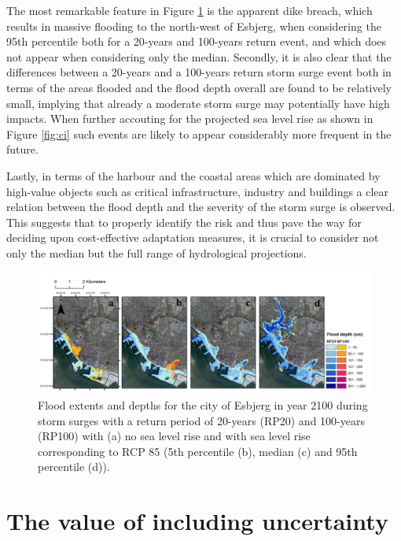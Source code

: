 \documentclass[note,screen,british,11pt]{nrdoc}
\begin{document}
The most remarkable feature in Figure \ref{fig:esbjerg} is the apparent dike breach, which results in massive flooding to the north-west of Esbjerg, when considering the 95th percentile both for a 20-years and 100-years return event, and which does not appear when considering only the median. Secondly, it is also clear that the differences between a 20-years and a 100-years return storm surge event both in terms of the areas flooded and the flood depth overall are found to be relatively small, implying that already a moderate storm surge may potentially have high impacts. When further accouting for the projected sea level rise as shown in Figure  \ref{fig:ci} such events are likely to appear considerably more frequent in the future.  

Lastly, in terms of the harbour and the coastal areas which are dominated by high-value objects such as critical infrastructure, industry and buildings a clear relation between the flood depth and the severity of the storm surge is observed. This suggests that to properly identify the risk and thus pave the way for deciding upon cost-effective adaptation measures, it is crucial to consider not only the median but the full range of hydrological projections.

\begin{figure}[!hbpt]
\begin{center}
\includegraphics[width=\linewidth]{FloodMaps_Harbour_RP20_RP100_dif2.png}
\caption{Flood extents and depths for the city of Esbjerg in year 2100 during storm surges with a return period of 20-years (RP20) and 100-years (RP100) with (a) no sea level rise and with sea level rise corresponding to RCP 85 (5th percentile (b), median (c) and 95th percentile (d)). }
\label{fig:esbjerg}
\end{center}
\end{figure}

\section{The value of including uncertainty}
\label{unc}
\end{document}
